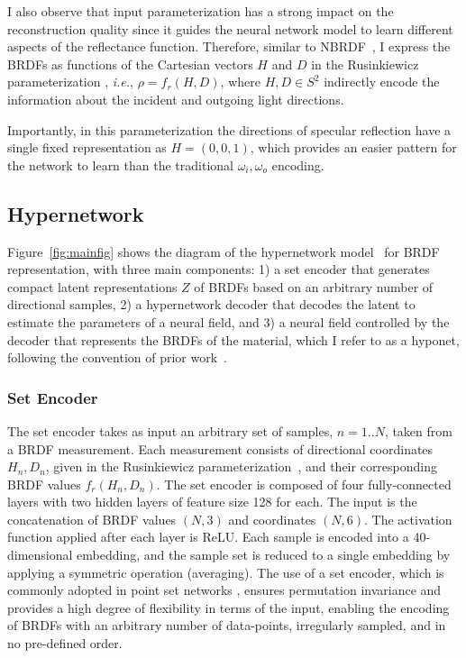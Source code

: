 I also observe that input parameterization has a strong impact on the reconstruction quality since it guides the neural network model to learn different aspects of the reflectance function. Therefore, similar to NBRDF~\cite{sztrajman2021neural}, I express the BRDFs as functions of the Cartesian vectors $H$ and $D$ in the Rusinkiewicz parameterization \cite{rusinkiewicz1998new},
\textit{i.e.}, $\rho=f_r(H, D)$, where $H, D \in S^2$ indirectly encode the information about the incident and outgoing light directions.

Importantly, in this parameterization the directions of specular reflection have a single fixed representation as $H=(0,0,1)$, which provides an easier pattern for the network to learn than the traditional $\omega_i, \omega_o$ encoding.


\subsection{Hypernetwork}
\label{sec:hypernet}

Figure~\ref{fig:mainfig} shows the diagram of the hypernetwork model~\cite{sitzmann2020siren} for BRDF representation, with three main components: 1) a set encoder that generates compact latent representations $Z$ of BRDFs based on an arbitrary number of directional samples, 2) a hypernetwork decoder that decodes the latent to estimate the parameters of a neural field,
and 3) a neural field controlled by the decoder that represents the BRDFs of the material, which I refer to as a hyponet, following the convention of prior work~\cite{sitzmann2020metasdf}.


\subsubsection{Set Encoder} %

The set encoder takes as input an arbitrary set of samples, $n=1..N$, taken from a BRDF measurement. Each measurement consists of directional coordinates ${H_n, D_n}$, given in the Rusinkiewicz parameterization~\cite{rusinkiewicz1998new}, and their corresponding BRDF values $f_r(H_n,D_n)$. The set encoder is composed of four fully-connected layers with two hidden layers of feature size 128 for each. The input is the concatenation of BRDF values $(N, 3)$ and coordinates $(N, 6)$. The activation function applied after each layer is ReLU. Each sample is encoded into a 40-dimensional embedding, and the sample set is reduced to a single embedding by applying a symmetric operation (averaging).
The use of a set encoder, which is commonly adopted in point set networks \cite{zaheer2017deepsets}, ensures permutation invariance and provides a high degree of flexibility in terms of the input, enabling the encoding of BRDFs with an arbitrary number of data-points, irregularly sampled, and in no pre-defined order.


